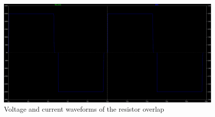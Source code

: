 \begin{figure}[H]
	\centering
	\includegraphics[width=\textwidth]{pictures/implementation/plain/plain_load.PNG}
	\caption{Voltage and current waveforms of the resistor overlap}
	\label{fig:plain_load}
\end{figure}